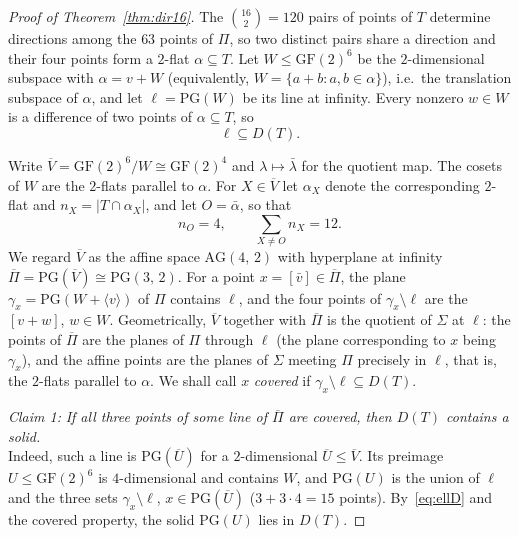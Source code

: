 \documentclass[12pt]{article}
\theoremstyle{definition}
\numberwithin{equation}{section}
\newcommand{\la}{\lambda}
\newcommand{\GF}[1]{\mathrm{GF}(#1)}
\newcommand{\PG}[2]{\mathrm{PG}(#1,\,#2)}
\newcommand{\PGv}[1]{\mathrm{PG}(#1)}
\newcommand{\AG}[2]{\mathrm{AG}(#1,\,#2)}
\begin{document}
\begin{proof}[Proof of Theorem~\ref{thm:dir16}]
The $\binom{16}2=120$ pairs of points of $T$ determine directions among the $63$ points of $\Pi$, so two distinct pairs share a direction and their four points form a $2$-flat $\alpha\subseteq T$.  Let $W\le\GF2^6$ be the $2$-dimensional subspace with $\alpha=v+W$ (equivalently, $W=\{a+b:a,b\in\alpha\}$), i.e.\ the translation subspace of $\alpha$, and let $\ell=\PGv{W}$ be its line at infinity.  Every nonzero $w\in W$ is a difference of two points of $\alpha\subseteq T$, so
\begin{equation}\label{eq:ellD}
\ell\subseteq D(T).
\end{equation}

\smallskip
Write $\overline V=\GF2^6/W\cong\GF2^4$ and $\la\mapsto\bar\la$ for the quotient map.  The cosets of $W$ are the $2$-flats parallel to $\alpha$. For $X\in\overline V$ let $\alpha_X$ denote the corresponding $2$-flat and $n_X=|T\cap\alpha_X|$, and let $O=\bar\alpha$, so that
\begin{equation}\label{eq:twelve}
n_O=4,\qquad \sum_{X\neq O}n_X=12 .
\end{equation}
We regard $\overline V$ as the affine space $\AG42$ with hyperplane at infinity $\overline\Pi=\PGv{\overline V}\cong\PG32$.  For a point $x=[\bar v]\in\overline\Pi$, the plane $\gamma_x=\PGv{W+\langle v\rangle}$ of $\Pi$ contains $\ell$, and the four points of $\gamma_x\setminus\ell$ are the $[v+w]$, $w\in W$.  Geometrically, $\overline V$ together with $\overline\Pi$ is the quotient of $\Sigma$ at $\ell$: the points of $\overline\Pi$ are the planes of $\Pi$ through $\ell$ (the plane corresponding to $x$ being $\gamma_x$), and the affine points are the planes of $\Sigma$ meeting $\Pi$ precisely in $\ell$, that is, the $2$-flats parallel to $\alpha$.  We shall call $x$ \textit{covered} if $\gamma_x\setminus\ell\subseteq D(T)$.

\smallskip
\noindent\textit{Claim 1:}  \textit{If all three points of some line of $\overline\Pi$ are covered, then $D(T)$ contains a solid.}\\ 
Indeed, such a line is $\PGv{\overline U}$ for a $2$-dimensional $\overline U\le\overline V$.  Its preimage $U\le\GF2^6$ is $4$-dimensional and contains $W$, and $\PGv U$ is the union of $\ell$ and the three sets $\gamma_x\setminus\ell$, $x\in\PGv{\overline U}$ ($3+3\cdot4=15$ points).  By~\eqref{eq:ellD} and the covered property, the solid $\PGv U$ lies in $D(T)$.


\end{proof}
\end{document}
